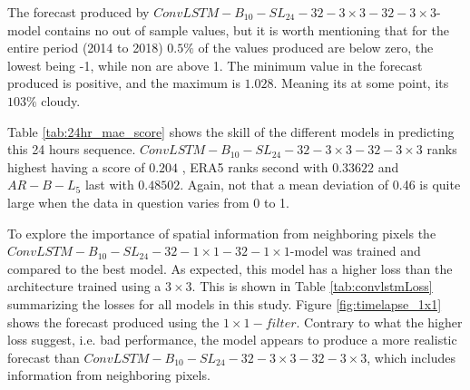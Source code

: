 The forecast produced by $ConvLSTM-B_{10}-SL_{24}-32-3\times3-32-3 \times3$-model contains no out of sample values, but it is worth mentioning that for the entire period (2014 to 2018) $0.5\%$ of the values produced are below zero, the lowest being -1, while non are above 1. The minimum value in the forecast produced is positive, and the maximum is $1.028$. Meaning its at some point, its $103\%$ cloudy.

Table \ref{tab:24hr_mae_score} shows the skill of the different models in predicting this 24 hours sequence. $ConvLSTM-B_{10}-SL_{24}-32-3\times3-32-3\times3$ ranks highest having a score of $0.204$
, ERA5 ranks second with  $0.33622$ and $AR-B-L_5$ last with  $0.48502$. Again, not that a mean deviation of 0.46 is quite large when the data in question varies from 0 to 1. 


To explore the importance of spatial information from neighboring pixels the $ConvLSTM-B_{10}-SL_{24}-32-1\times1-32-1 \times1$-model was trained and compared to the best model. As expected, this model has a higher loss than the architecture trained using a $3\times 3$. This is shown in Table \ref{tab:convlstmLoss} summarizing the losses for all models in this study. Figure \ref{fig:timelapse_1x1} shows the forecast produced using the $1\times1-filter$. Contrary to what the higher loss suggest, i.e. bad performance, the model appears to produce a more realistic forecast than $ConvLSTM-B_{10}-SL_{24}-32-3\times3-32-3\times3$, which includes information from neighboring pixels. 



